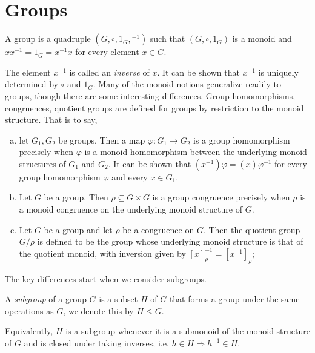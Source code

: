 \section{Groups}

\begin{definition}%
  \label{def:group}
  \rocqok{}
A group is a quadruple $(G, \circ, 1_G, {}^{-1})$ such that $(G, \circ, 1_G)$ is a monoid and
$xx^{-1} = 1_G = x^{-1}x$ for every element $x\in G$.
\end{definition}

The element $x^{-1}$ is called an \emph{inverse} of $x$.
It can be shown that $x^{-1}$ is uniquely determined by $\circ$ and $1_G$.
Many of the monoid notions generalize readily to groups, though there are some interesting differences.
Group homomorphisms, congruences, quotient groups are defined for groups by restriction to the
monoid structure. That is to say,
\begin{enumerate}[(a)]
  \item let $G_1, G_2$ be groups. Then a map $\varphi: G_1 \rightarrow G_2$ is a group
    homomorphism precisely when $\varphi$ is a monoid homomorphism between the underlying monoid
    structures of $G_1$ and $G_2$. It can be shown that $(x^{-1})\varphi = (x)\varphi^{-1}$ for
    every group homomorphism $\varphi$ and every $x \in G_1$.
  \item Let $G$ be a group. Then $\rho\subseteq G\times G$ is a group congruence precisely when
    $\rho$ is a monoid congruence on the underlying monoid structure of $G$.
  \item Let $G$ be a group and let $\rho$ be a congruence on $G$. Then the quotient group
    $G/\rho$ is defined to be the group whose underlying monoid structure is that of the quotient
    monoid, with inversion given by ${[x]}_\rho^{-1} = {[x^{-1}]}_\rho$;
\end{enumerate}

The key differences start when we consider subgroups.

\begin{definition}%
  \label{def:subgroup}
  \rocqok{}
  A \emph{subgroup} of a group $G$ is a subset $H$ of $G$ that forms a group under the same
  operations as $G$, we denote this by $H\leq G$.
\end{definition}
Equivalently, $H$ is a subgroup whenever it is a submonoid of the monoid structure of $G$ and is
closed under taking inverses, i.e. $h\in H \Rightarrow h^{-1}\in H$.

